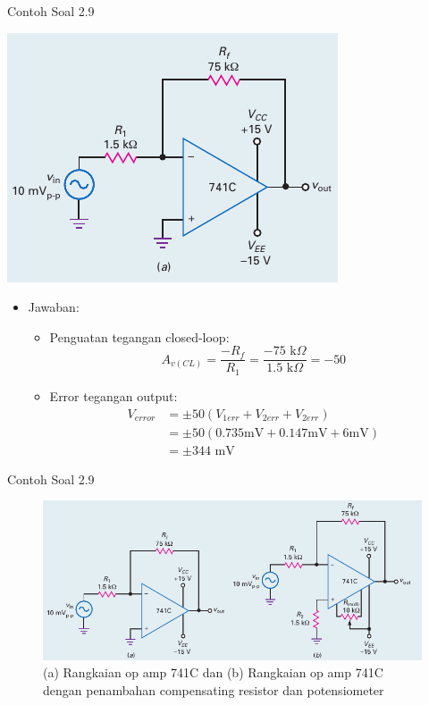 \begin{frame}[t]{Contoh Soal 2.9}
	\begin{multicols}{2}
		\begin{center}
			\includegraphics[width=\linewidth]{gambar/fig-16.17a}
		\end{center}
		\columnbreak
		\begin{itemize}
			\item Jawaban:
			\begin{itemize}
				\item Penguatan tegangan closed-loop:
				\[ A_{v(CL)} = \frac{-R_f}{R_1} = \frac{-75 \text{ k}\Omega}{1.5 \text{ k}\Omega} = -50\]
				\item Error tegangan output:
				\begin{align*}
					V_{error} &= \pm 50 (V_{1err} + V_{2err} + V_{2err}) \\
					&= \pm 50 (0.735 \text{mV} + 0.147 \text{mV} + 6 \text{mV}) \\
					&= \pm 344 \text{ mV}
				\end{align*}
			\end{itemize}
		\end{itemize}
	\end{multicols}
\end{frame}

\begin{frame}[t]{Contoh Soal 2.9}
	\begin{figure}
		\centering
		\includegraphics[width=0.8\linewidth]{gambar/fig-16.17}
		\caption{(a) Rangkaian op amp 741C dan (b) Rangkaian op amp 741C dengan penambahan compensating resistor dan potensiometer}
		\label{fig-16.17}
	\end{figure}
	
\end{frame}